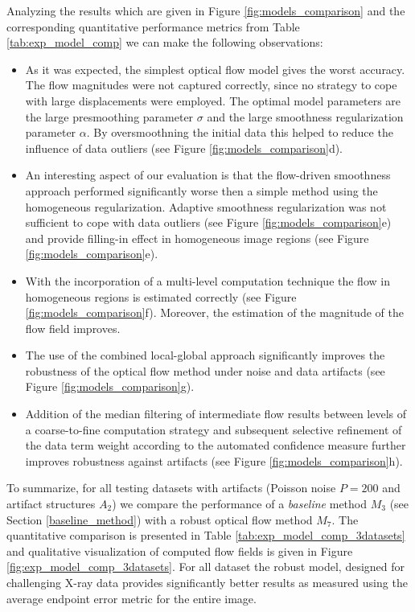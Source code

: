Analyzing the results which are given in Figure \ref{fig:models_comparison} and the corresponding quantitative performance metrics from Table \ref{tab:exp_model_comp} we can make the following observations:
\begin{itemize}
	\item  As it was expected, the simplest optical flow model gives the worst accuracy. The flow magnitudes were not captured correctly, since no strategy to cope with large displacements were employed. The optimal model parameters are the large presmoothing parameter $\sigma$ and the large smoothness regularization parameter $\alpha$.  By oversmoothning the initial data this helped to reduce the influence of data outliers (see Figure \ref{fig:models_comparison}d).
	
	\item  An interesting aspect of our evaluation is that the flow-driven smoothness approach performed significantly worse then a simple method using the homogeneous regularization. Adaptive smoothness regularization was not sufficient to cope with data outliers (see Figure \ref{fig:models_comparison}e) and provide filling-in effect in homogeneous image regions (see Figure \ref{fig:models_comparison}e).  

	\item With the incorporation of a multi-level computation technique the flow in homogeneous regions is estimated correctly (see Figure \ref{fig:models_comparison}f). Moreover, the estimation of the magnitude of the flow field improves.
	
	\item The use of the combined local-global approach significantly improves the robustness of the optical flow method under noise and data artifacts (see Figure \ref{fig:models_comparison}g). 

	\item Addition of the median filtering of intermediate flow results between levels of a coarse-to-fine computation strategy and subsequent selective refinement of the data term weight according to the automated confidence measure further improves robustness against artifacts (see Figure \ref{fig:models_comparison}h).
		
\end{itemize}

To summarize, for all testing datasets with artifacts (Poisson noise $P=200$ and artifact structures $A_2$) we compare the performance of a \textit{baseline}  method $M_3$ (see Section \ref{baseline_method}) with a robust optical flow method $M_7$.
The quantitative comparison is presented in Table \ref{tab:exp_model_comp_3datasets} and qualitative visualization of computed flow fields is given in Figure \ref{fig:exp_model_comp_3datasets}.
For all dataset the robust model, designed for challenging X-ray data provides significantly better results as measured using the average endpoint error metric for the entire image.
   


